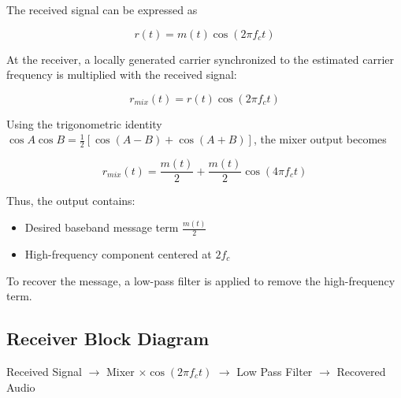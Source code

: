 \documentclass{article}
\begin{document}
The received signal can be expressed as

\begin{equation*}
r(t)=m(t)\cos(2\pi f_c t)
\end{equation*}
\vspace{-0.3cm}

At the receiver, a locally generated carrier synchronized to the estimated carrier frequency is multiplied with the received signal:

\begin{equation*}
r_{mix}(t)=r(t)\cos(2\pi f_c t)
\end{equation*}
\vspace{-0.3cm}

Using the trigonometric identity $\cos A \cos B = \frac{1}{2}[\cos(A-B)+\cos(A+B)]$, the mixer output becomes

\begin{equation*}
r_{mix}(t)=\frac{m(t)}{2}+\frac{m(t)}{2}\cos(4\pi f_c t)
\end{equation*}
\vspace{-0.3cm}

Thus, the output contains:

\begin{itemize}
\item[$\rightarrow$] Desired baseband message term $\frac{m(t)}{2}$
\item[$\rightarrow$] High-frequency component centered at $2f_c$
\end{itemize}

To recover the message, a low-pass filter is applied to remove the high-frequency term.
\newpage

\subsection*{Receiver Block Diagram}

\begin{center}
Received Signal $\rightarrow$ Mixer $\times \cos(2\pi f_c t)$ $\rightarrow$ Low Pass Filter $\rightarrow$ Recovered Audio
\end{center}
\end{document}
